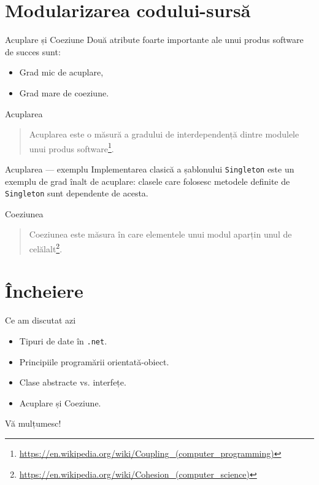 \documentclass[presentation]{beamer}
\begin{document}
\section{Modularizarea codului-sursă}
\label{sec:org03f3194}
\begin{frame}[label={sec:orgdb23bb1}]{Acuplare și Coeziune}
Două atribute foarte importante ale unui produs software de succes sunt:
\begin{itemize}
\item Grad mic de acuplare,
\item Grad mare de coeziune.
\end{itemize}
\end{frame}
\begin{frame}[label={sec:orgd03c6b9}]{Acuplarea}
\begin{quotation} %
\alert{Acuplarea} este o măsură a gradului de interdependență dintre modulele unui produs software\footnote{\url{https://en.wikipedia.org/wiki/Coupling\_(computer\_programming)}}.
\end{quotation}
\end{frame}
\begin{frame}[label={sec:orgf70361d},fragile]{Acuplarea --- exemplu}
 Implementarea clasică a șablonului \texttt{Singleton} este un exemplu de grad înalt de acuplare: clasele care folosesc metodele definite de \texttt{Singleton} sunt dependente de acesta.
\end{frame}
\begin{frame}[label={sec:orgc8d554d}]{Coeziunea}
\begin{quotation} %
\alert{Coeziunea} este măsura în care elementele unui modul aparțin unul de celălalt\footnote{\url{https://en.wikipedia.org/wiki/Cohesion\_(computer\_science)}}.
\end{quotation}
\end{frame}
\section{Încheiere}
\label{sec:org6ef0d38}
\begin{frame}[label={sec:orgfceeaa8},fragile]{Ce am discutat azi}
 \begin{itemize}
\item Tipuri de date în \texttt{.net}.
\item Principiile programării orientată-obiect.
\item Clase abstracte vs. interfețe.
\item Acuplare și Coeziune.
\end{itemize}
\end{frame}
\begin{frame}[label={sec:orgd6a6420}]{Vă mulțumesc!}
\end{frame}
\end{document}
